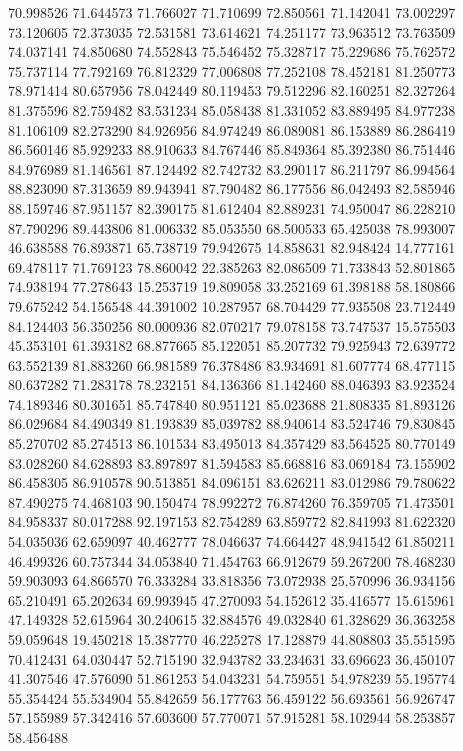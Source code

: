 70.998526
71.644573
71.766027
71.710699
72.850561
71.142041
73.002297
73.120605
72.373035
72.531581
73.614621
74.251177
73.963512
73.763509
74.037141
74.850680
74.552843
75.546452
75.328717
75.229686
75.762572
75.737114
77.792169
76.812329
77.006808
77.252108
78.452181
81.250773
78.971414
80.657956
78.042449
80.119453
79.512296
82.160251
82.327264
81.375596
82.759482
83.531234
85.058438
81.331052
83.889495
84.977238
81.106109
82.273290
84.926956
84.974249
86.089081
86.153889
86.286419
86.560146
85.929233
88.910633
84.767446
85.849364
85.392380
86.751446
84.976989
81.146561
87.124492
82.742732
83.290117
86.211797
86.994564
88.823090
87.313659
89.943941
87.790482
86.177556
86.042493
82.585946
88.159746
87.951157
82.390175
81.612404
82.889231
74.950047
86.228210
87.790296
89.443806
81.006332
85.053550
68.500533
65.425038
78.993007
46.638588
76.893871
65.738719
79.942675
14.858631
82.948424
14.777161
69.478117
71.769123
78.860042
22.385263
82.086509
71.733843
52.801865
74.938194
77.278643
15.253719
19.809058
33.252169
61.398188
58.180866
79.675242
54.156548
44.391002
10.287957
68.704429
77.935508
23.712449
84.124403
56.350256
80.000936
82.070217
79.078158
73.747537
15.575503
45.353101
61.393182
68.877665
85.122051
85.207732
79.925943
72.639772
63.552139
81.883260
66.981589
76.378486
83.934691
81.607774
68.477115
80.637282
71.283178
78.232151
84.136366
81.142460
88.046393
83.923524
74.189346
80.301651
85.747840
80.951121
85.023688
21.808335
81.893126
86.029684
84.490349
81.193839
85.039782
88.940614
83.524746
79.830845
85.270702
85.274513
86.101534
83.495013
84.357429
83.564525
80.770149
83.028260
84.628893
83.897897
81.594583
85.668816
83.069184
73.155902
86.458305
86.910578
90.513851
84.096151
83.626211
83.012986
79.780622
87.490275
74.468103
90.150474
78.992272
76.874260
76.359705
71.473501
84.958337
80.017288
92.197153
82.754289
63.859772
82.841993
81.622320
54.035036
62.659097
40.462777
78.046637
74.664427
48.941542
61.850211
46.499326
60.757344
34.053840
71.454763
66.912679
59.267200
78.468230
59.903093
64.866570
76.333284
33.818356
73.072938
25.570996
36.934156
65.210491
65.202634
69.993945
47.270093
54.152612
35.416577
15.615961
47.149328
52.615964
30.240615
32.884576
49.032840
61.328629
36.363258
59.059648
19.450218
15.387770
46.225278
17.128879
44.808803
35.551595
70.412431
64.030447
52.715190
32.943782
33.234631
33.696623
36.450107
41.307546
47.576090
51.861253
54.043231
54.759551
54.978239
55.195774
55.354424
55.534904
55.842659
56.177763
56.459122
56.693561
56.926747
57.155989
57.342416
57.603600
57.770071
57.915281
58.102944
58.253857
58.456488
